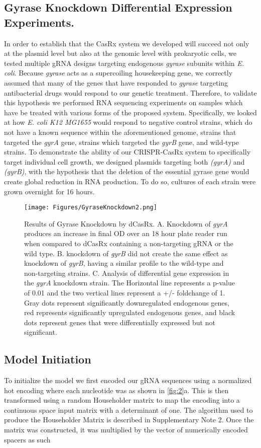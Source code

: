 \documentclass[times]{zHenriquesLab-StyleBioRxiv}
\begin{document}
\subsection{Gyrase Knockdown Differential Expression Experiments.}
In order to establish that the CasRx system we developed will succeed not only at the plasmid level but also at the genomic level with prokaryotic cells, we tested multiple gRNA designs targeting endogenous {\it gyrase} subunits within {\it E. coli}. 
Because {\it gyrase} acts as a supercoiling housekeeping gene, we correctly assumed that many of the genes that have responded to {\it gyrase} targeting antibacterial drugs would respond to our genetic treatment. 
Therefore, to validate this hypothesis we performed RNA sequencing experiments on samples which have be treated with various forms of the proposed system. 
Specifically, we looked at how {\it E. coli K12 MG1655} would respond to negative control strains, which do not have a known sequence within the aforementioned genome, strains that targeted the {\it gyrA} gene, strains which targeted the {\it gyrB} gene, and wild-type strains.
To demonstrate the ability of our CRISPR-CasRx system to specifically target individual cell growth, we designed plasmids targeting both {\it(gyrA)} and {\it(gyrB)}, with the hypothesis that the deletion of the essential gyrase gene would create global reduction in RNA production. To do so, cultures of each strain were grown overnight for 16 hours.
\begin{figure*}[ht!]
    \centering
    \texttt{[image: Figures/GyraseKnockdown2.png]}
    \caption{Results of Gyrase Knockdown by dCasRx. A. Knockdown of \textit{gyrA} produces an increase in final OD over an 18 hour plate reader run when compared to dCasRx containing a non-targeting gRNA or the wild type. B. knockdown of \textit{gyrB} did not create the same effect as knockdown of \textit{gyrB}, having a similar profile to the wild-type and non-targeting strains. C. Analysis of differential gene expression in the \textit{gyrA} knockdown strain. The Horizontal line represents a p-value of 0.01 and the two vertical lines represent a +/- foldchange of 1. Gray dots represent significantly downregulated endogenous genes, red represents significantly upregulated endogenous genes, and black dots represent genes that were differentially expressed but not significant.  }
    \label{fig:GyraseKnockdown}
\end{figure*}
\subsection{Model Initiation}
To initialize the model we first encoded our gRNA sequences using a normalized hot encoding where each nucleotide was as shown in \ref{fig:2}a. This is then transformed using a random Householder matrix to map the encoding into a continuous space input matrix with a determinant of one. The algorithm used to produce the Householder Matrix is described in Supplementary Note 2. Once the matrix was constructed, it was multiplied by the vector of numerically encoded spacers as such
\end{document}
